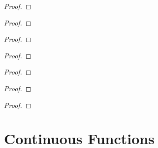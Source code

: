 \begin{exercise}\label{chapter2:section17:exercise15}
\end{exercise}

\begin{proof}
\end{proof}

\begin{exercise}\label{chapter2:section17:exercise16}
\end{exercise}

\begin{proof}
\end{proof}

\begin{exercise}\label{chapter2:section17:exercise17}
\end{exercise}

\begin{proof}
\end{proof}

\begin{exercise}\label{chapter2:section17:exercise18}
\end{exercise}

\begin{proof}
\end{proof}


\begin{exercise}\label{chapter2:section17:exercise19}
\end{exercise}

\begin{proof}
\end{proof}

\begin{exercise}\label{chapter2:section17:exercise20}
\end{exercise}

\begin{proof}
\end{proof}

\begin{exercise}\label{chapter2:section17:exercise21}
\end{exercise}

\begin{proof}
\end{proof}

\section{Continuous Functions}

